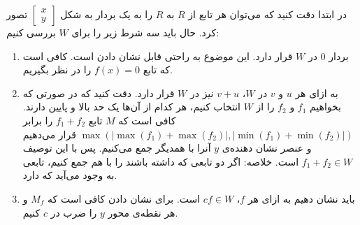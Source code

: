 \documentclass[]{article}
\begin{document}
{
	\thispagestyle{fancy}
	\fancyhf{}
	\fancyfoot{}
	\cfoot{\thepage}
	\renewcommand{\headrulewidth}{2pt}
	\KashidaOff
}
\noindent
در ابتدا دقت کنید که می‌توان هر تابع از $R$ به $R$ را به یک بردار به شکل
$\begin{bmatrix}x \\ y\end{bmatrix}$
تصور کرد.
حال باید سه شرط زیر را برای
$W$
بررسی کنیم:
\begin{enumerate}
	\item بردار 0 در $W$ قرار دارد.
این موضوع به راحتی قابل نشان دادن است. کافی است که تابع
$f(x) = 0$
را در نظر بگیریم.
	\item به ازای هر $u$ و $v$ در $W$، $v + u$ نیز در $W$ قرار دارد.
دقت کنید که در صورتی که بخواهیم
$f_1$ و $f_2$
را از $W$ انتخاب کنیم، هر کدام از آن‌ها یک حد بالا و پایین دارند.
کافی است که
$M$ تابع $f_1 + f_2$
را برابر
$\operatorname{max}(|\operatorname{max}(f_1) + \operatorname{max}(f_2)|,|\operatorname{min}(f_1) + \operatorname{min}(f_2)|)$
قرار می‌دهیم و عنصر نشان دهنده‌ی $y$ آنرا با همدیگر جمع می‌کنیم.
پس با این توصیف
$f_1 + f_2 \in W$
است.
خلاصه: اگر دو تابعی که
داشته باشند را با هم جمع کنیم، تابعی به وجود می‌آید که
دارد.
	\item باید نشان دهیم به ازای هر $f$، $cf \in W$ است.
برای نشان دادن کافی است که
$M_f$ و هر نقطه‌ی محور $y$ را ضرب در $c$ کنیم.
\end{enumerate}
\end{document}
